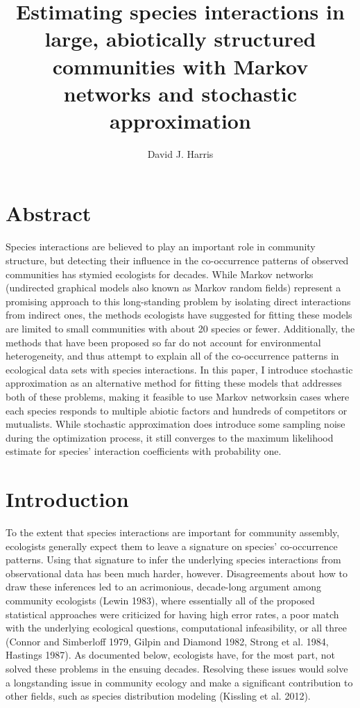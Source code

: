 \documentclass[12pt,]{article}
\title{Estimating species interactions in large, abiotically structured
communities with Markov networks and stochastic approximation}
\author{David J. Harris}
\date{}
\begin{document}
\maketitle


\begin{spacing}{1.9}
\begin{flushleft}
\section{Abstract}\label{abstract}

Species interactions are believed to play an important role in community
structure, but detecting their influence in the co-occurrence patterns
of observed communities has stymied ecologists for decades. While Markov
networks (undirected graphical models also known as Markov random
fields) represent a promising approach to this long-standing problem by
isolating direct interactions from indirect ones, the methods ecologists
have suggested for fitting these models are limited to small communities
with about 20 species or fewer. Additionally, the methods that have been
proposed so far do not account for environmental heterogeneity, and thus
attempt to explain all of the co-occurrence patterns in ecological data
sets with species interactions. In this paper, I introduce stochastic
approximation as an alternative method for fitting these models that
addresses both of these problems, making it feasible to use Markov
networksin cases where each species responds to multiple abiotic factors
and hundreds of competitors or mutualists. While stochastic
approximation does introduce some sampling noise during the optimization
process, it still converges to the maximum likelihood estimate for
species' interaction coefficients with probability one.

\section{Introduction}\label{introduction}

To the extent that species interactions are important for community
assembly, ecologists generally expect them to leave a signature on
species' co-occurrence patterns. Using that signature to infer the
underlying species interactions from observational data has been much
harder, however. Disagreements about how to draw these inferences led to
an acrimonious, decade-long argument among community ecologists (Lewin
1983), where essentially all of the proposed statistical approaches were
criticized for having high error rates, a poor match with the underlying
ecological questions, computational infeasibility, or all three (Connor
and Simberloff 1979, Gilpin and Diamond 1982, Strong et al. 1984,
Hastings 1987). As documented below, ecologists have, for the most part,
not solved these problems in the ensuing decades. Resolving these issues
would solve a longstanding issue in community ecology and make a
significant contribution to other fields, such as species distribution
modeling (Kissling et al. 2012).


\end{flushleft}
\end{spacing}
\end{document}
